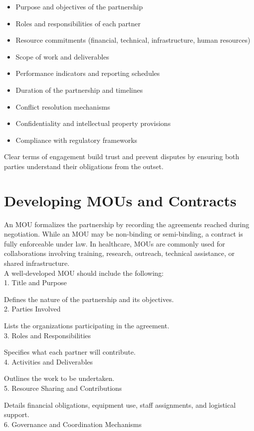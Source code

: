 \documentclass[10pt]{article}
\begin{document}
\begin{itemize}
  \item Purpose and objectives of the partnership
  \item Roles and responsibilities of each partner
  \item Resource commitments (financial, technical, infrastructure, human resources)
  \item Scope of work and deliverables
  \item Performance indicators and reporting schedules
  \item Duration of the partnership and timelines
  \item Conflict resolution mechanisms
  \item Confidentiality and intellectual property provisions
  \item Compliance with regulatory frameworks
\end{itemize}

Clear terms of engagement build trust and prevent disputes by ensuring both parties understand their obligations from the outset.

\section*{Developing MOUs and Contracts}
An MOU formalizes the partnership by recording the agreements reached during negotiation. While an MOU may be non-binding or semi-binding, a contract is fully enforceable under law. In healthcare, MOUs are commonly used for collaborations involving training, research, outreach, technical assistance, or shared infrastructure.\\
A well-developed MOU should include the following:\\
1. Title and Purpose

Defines the nature of the partnership and its objectives.\\
2. Parties Involved

Lists the organizations participating in the agreement.\\
3. Roles and Responsibilities

Specifies what each partner will contribute.\\
4. Activities and Deliverables

Outlines the work to be undertaken.\\
5. Resource Sharing and Contributions

Details financial obligations, equipment use, staff assignments, and logistical support.\\
6. Governance and Coordination Mechanisms
\end{document}
